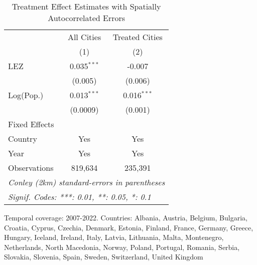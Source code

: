 
\begin{table}[htbp]
   \caption{\label{tab:te_conley} Treatment Effect Estimates with Spatially Autocorrelated Errors}
   \centering
   \small
   \begin{tabular}{lcc}
      \tabularnewline \midrule \midrule
                   & All Cities    & Treated Cities \\   
                   & (1)           & (2)\\  
      LEZ          & 0.035$^{***}$ & -0.007\\   
                   & (0.005)       & (0.006)\\   
      Log(Pop.)    & 0.013$^{***}$ & 0.016$^{***}$\\   
                   & (0.0009)      & (0.001)\\   
      Fixed Effects\\
      Country      & Yes           & Yes\\  
      Year         & Yes           & Yes\\  
      \midrule 
      Observations & 819,634       & 235,391\\  
      \midrule \midrule
      \multicolumn{3}{l}{\emph{Conley (2km) standard-errors in parentheses}}\\
      \multicolumn{3}{l}{\emph{Signif. Codes: ***: 0.01, **: 0.05, *: 0.1}}\\
   \end{tabular}
   
   \par \raggedright 
   Temporal coverage: 2007-2022. Countries: Albania, Austria, Belgium, Bulgaria, Croatia, Cyprus, Czechia, Denmark, Estonia, Finland, France, Germany, Greece, Hungary, Iceland, Ireland, Italy, Latvia, Lithuania, Malta, Montenegro, Netherlands, North Macedonia, Norway, Poland, Portugal, Romania, Serbia, Slovakia, Slovenia, Spain, Sweden, Switzerland, United Kingdom
\end{table}


